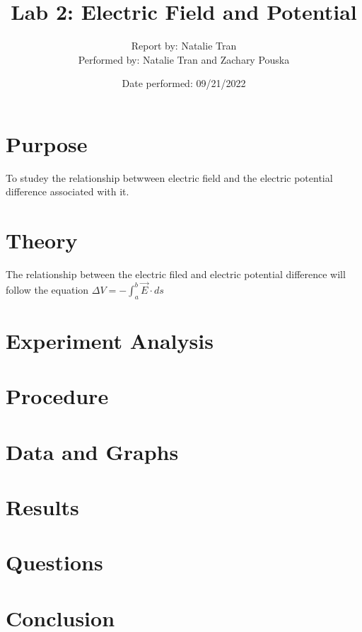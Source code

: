 \documentclass{article}
\title{\textbf{Lab 2: Electric Field and Potential}}
\author{Report by: Natalie Tran\\
Performed by: Natalie Tran and Zachary Pouska}
\date{Date performed: 09/21/2022}
\begin{document}
	\maketitle
	\section{Purpose}
	To studey the relationship betwween electric field and the electric potential difference associated with it.
	\section{Theory}	
	The relationship between the electric filed and electric potential difference will follow the equation \(\Delta V = -\int_{a}^{b} \vec{E} \cdot ds\)
	\section{Experiment Analysis}
	\section{Procedure}
	\section{Data and Graphs}
	\section{Results}
	\section{Questions}
	\section{Conclusion}
	
\end{document}

